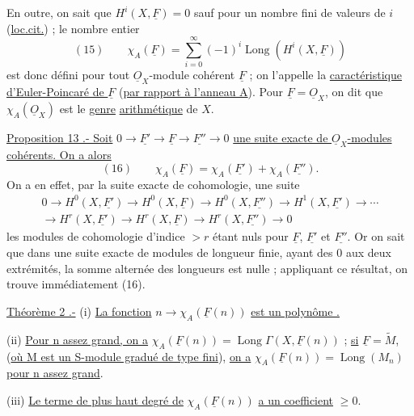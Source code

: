 En outre, on sait que $H^i(X,\underline F)=0$ sauf pour un nombre fini de valeurs de $i$ (\uline{loc.cit.}) ; le nombre entier
\[
(15)\qquad\chi_A(\underline F)=\sum_{i=0}^{\infty}(-1)^i\operatorname{Long}(H^i(X,\underline F))
\]
est donc défini pour tout $\underline O_X$-module cohérent $\underline F$ ; on l'appelle la \uline{caractéristique d'Euler-Poincaré de $\underline F$} (\uline{par rapport à l'anneau A}).
Pour $\underline F=\underline O_X$, on dit que $\chi_A(\underline O_X)$ est le \uline{genre}  \uline{arithmétique} de $X$.

\uline{Proposition 13 .- Soit} $0\to\underline{F'}\to\underline F\to\underline{F''}\to0$ \uline{une suite exacte de $\underline O_X$-modules cohérents. On a alors}
\[
(16)\qquad\chi_A(\underline F)=\chi_A(\underline{F'})+\chi_A(\underline{F''}).
\]
On a en effet, par la suite exacte de cohomologie, une suite 
\[
\begin{gathered}
0\to H^0(X,\underline{F'})\to H^0(X,\underline F)\to H^0(X,\underline{F''})\to H^1(X,\underline{F'})\to\cdots\\
\to H^r(X,\underline{F'})\to H^r(X,\underline F)\to H^r(X,\underline{F''})\to0
\end{gathered}
\]
 les modules de cohomologie d'indice $>r$ étant nuls pour $\underline F$, $\underline{F'}$ et $\underline{F''}$. Or on sait que dans une suite exacte de modules de longueur finie, ayant des 0 aux deux extrémités, la somme alternée des longueurs est nulle ; appliquant ce résultat, on trouve immédiatement (16).

\uline{Théorème 2 .-} 
(i)  \uline{La fonction} $n\to\chi_A(\underline F(n))$ \uline{est  un polynôme .}

(ii) \uline{Pour n assez grand, on a} $\chi_A(\underline F(n))=\operatorname{Long}\Gamma(X,\underline F(n))$ ; \uline{si} $\underline F=\widetilde M$,  (\uline{où M est un S-module gradué de type fini}), \uline{on a} $\chi_A(\underline F(n))=\operatorname{Long}(M_n)$ \uline{pour n assez grand}.

(iii) \uline{Le terme de plus haut degré de} $\chi_A(\underline F(n))$ \uline{a un coefficient} $\geq0$.
\margin{$>$}


